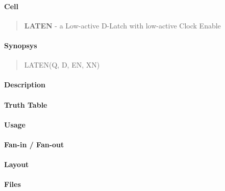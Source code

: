 \label{LATEN}
\paragraph{Cell}
\begin{quote}
    \textbf{LATEN} - a Low-active D-Latch with low-active Clock Enable
\end{quote}

\paragraph{Synopsys}
\begin{quote}
    LATEN(Q, D, EN, XN)
\end{quote}

\paragraph{Description}

%

\paragraph{Truth Table}
%

\paragraph{Usage}

\paragraph{Fan-in / Fan-out}

\paragraph{Layout}

\paragraph{Files}
